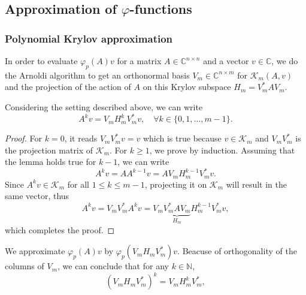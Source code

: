 \subsection{Approximation of \texorpdfstring{$\varphi$}{Phi}-functions}\label{sec:krylovmethodunivariate}

\subsubsection{Polynomial Krylov approximation}
\label{sec:polynomialkrylovapproximation}
In order to evaluate $\varphi_p(A)v$ for a matrix $A \in \mathbb{C}^{n \times n}$ and a vector $v \in \mathbb{C}$,
we do the Arnoldi algorithm to get an orthonormal basis $V_m \in \mathbb{C}^{n \times m}$
for $\mathcal{K}_m(A, v)$ and the projection of the action of $A$ on this Krylov subspace $H_m = V_m^* A V_m$.

\begin{lemma}
    \label{lem:krylovsubspacepowered}
    Considering the setting described above, we can write
    \begin{equation}
        A^k v = V_m H_m^k V_m^* v, \quad \forall k \in \{0, 1, \dots, m-1 \}.
    \end{equation}
\end{lemma}

\begin{proof}
    For $k=0$, it reads $V_m V_m^* v = v$ which is true because $v \in \mathcal{K}_m$ and $V_m V_m^*$
    is the projection matrix of $\mathcal{K}_m$. For $k \ge 1$, we prove by induction. Assuming that
    the lemma holds true for $k-1$, we can write
    \begin{equation*}
        A^{k} v = A A^{k-1} v = A V_m H_m^{k-1} V_m^* v.
    \end{equation*}
    Since $A^{k} v \in \mathcal{K}_m$ for all $1 \le k \le m-1$, projecting it on $\mathcal{K}_m$ will result in the same vector,
    thus
    \begin{equation*}
        A^{k} v = V_m V_m^* A^{k} v = V_m \underset{H_m}{\underbrace{V_m^* A V_m}} H_m^{k-1} V_m^* v,
    \end{equation*}
    which completes the proof.
\end{proof}

We approximate $\varphi_p(A)v$ by $\varphi_p(V_m H_m V_m^*)v$. Beacuse of orthogonality of the columns of $V_m$,
we can conclude that for any $k \in \mathbb{N}$,
\begin{equation*}
    \label{eq:reprojectionpower}
    (V_m H_m V_m^*)^{k} = V_m H_m^k V_m^*,
\end{equation*}

